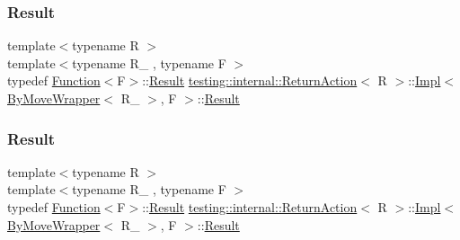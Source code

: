 \subsubsection{\texorpdfstring{Result}{Result}\hspace{0.1cm}{\footnotesize\ttfamily [2/3]}}
{\footnotesize\ttfamily template$<$typename R $>$ \\
template$<$typename R\+\_\+ , typename F $>$ \\
typedef \mbox{\hyperlink{structtesting_1_1internal_1_1_function}{Function}}$<$F$>$\+::\mbox{\hyperlink{classtesting_1_1_action_interface_a7477de2fe3e4e01c59db698203acaee7}{Result}} \mbox{\hyperlink{classtesting_1_1internal_1_1_return_action}{testing\+::internal\+::\+Return\+Action}}$<$ R $>$\+::\mbox{\hyperlink{classtesting_1_1internal_1_1_return_action_1_1_impl}{Impl}}$<$ \mbox{\hyperlink{structtesting_1_1internal_1_1_by_move_wrapper}{By\+Move\+Wrapper}}$<$ R\+\_\+ $>$, F $>$\+::\mbox{\hyperlink{classtesting_1_1_action_interface_a7477de2fe3e4e01c59db698203acaee7}{Result}}}

\mbox{\label{classtesting_1_1internal_1_1_return_action_1_1_impl_3_01_by_move_wrapper_3_01_r___01_4_00_01_f_01_4_a9b727fcbbd1fa17e03a78d115fc81707}} 
\subsubsection{\texorpdfstring{Result}{Result}\hspace{0.1cm}{\footnotesize\ttfamily [3/3]}}
{\footnotesize\ttfamily template$<$typename R $>$ \\
template$<$typename R\+\_\+ , typename F $>$ \\
typedef \mbox{\hyperlink{structtesting_1_1internal_1_1_function}{Function}}$<$F$>$\+::\mbox{\hyperlink{classtesting_1_1_action_interface_a7477de2fe3e4e01c59db698203acaee7}{Result}} \mbox{\hyperlink{classtesting_1_1internal_1_1_return_action}{testing\+::internal\+::\+Return\+Action}}$<$ R $>$\+::\mbox{\hyperlink{classtesting_1_1internal_1_1_return_action_1_1_impl}{Impl}}$<$ \mbox{\hyperlink{structtesting_1_1internal_1_1_by_move_wrapper}{By\+Move\+Wrapper}}$<$ R\+\_\+ $>$, F $>$\+::\mbox{\hyperlink{classtesting_1_1_action_interface_a7477de2fe3e4e01c59db698203acaee7}{Result}}}



